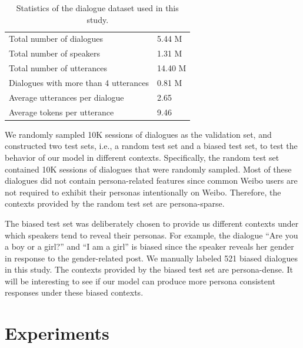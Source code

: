 \documentclass[letterpaper]{article} %
\begin{document}
\begin{table}[tb]
\centering
\caption{Statistics of the dialogue dataset used in this study.}
 \begin{tabular}{ll}
  \toprule
  Total number of dialogues             & 5.44 M  \\
  Total number of speakers              & 1.31 M  \\
  Total number of utterances            & 14.40 M \\
  Dialogues with more than 4 utterances & 0.81 M  \\
  Average utterances per dialogue       & 2.65    \\
  Average tokens per utterance          & 9.46    \\
  \bottomrule
 \end{tabular}
\label{tab:dataset}
\end{table}

We randomly sampled 10K sessions of dialogues as the validation set, and constructed two test sets, i.e., a random test set and a biased test set, to test the behavior of our model in different contexts. Specifically, the random test set contained 10K sessions of dialogues that were randomly sampled. Most of these dialogues did not contain persona-related features since common Weibo users are not required to exhibit their personas intentionally on Weibo. Therefore, the contexts provided by the random test set are persona-sparse.

The biased test set was deliberately chosen to provide us different contexts under which speakers tend to reveal their personas. For example, the dialogue ``Are you a boy or a girl?'' and ``I am a girl'' is biased since the speaker reveals her gender in response to the gender-related post. We manually labeled 521 biased dialogues in this study. The contexts provided by the biased test set are persona-dense. It will be interesting to see if our model can produce more persona consistent responses under these biased contexts.

\section{Experiments}\label{sec:exp}
\end{document}
